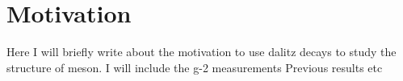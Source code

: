 \section{Motivation}\label{sec:motivation}
Here I will briefly write about the motivation to use dalitz decays to study the structure of meson.
I will include the g-2 measurements
Previous results
etc